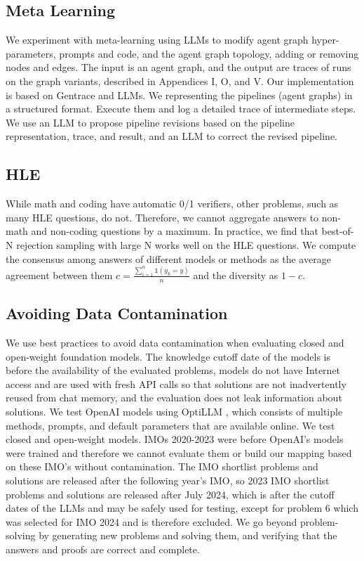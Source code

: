 \subsection{Meta Learning}
We experiment with meta-learning using LLMs to modify agent graph hyper-parameters, prompts and code, and the agent graph topology, adding or removing nodes and edges. The input is an agent graph, and the output are traces of runs on the graph variants, described in Appendices I, O, and V. Our implementation is based on Gentrace \cite{gentrace} and LLMs.
We representing the pipelines (agent graphs) in a structured format. Execute them and log a detailed trace of intermediate steps. We use an LLM to propose pipeline revisions based on the pipeline representation, trace, and result, and an LLM to correct the revised pipeline.

\subsection{HLE}
While math and coding have automatic 0/1 verifiers, other problems, such as many HLE questions, do not. Therefore, we cannot aggregate answers to non-math and non-coding questions by a maximum. In practice, we find that best-of-N rejection sampling with large N works well on the HLE questions. We compute the consensus among answers of different models or methods as the average agreement between them $c = \frac{\sum_{i=1}^{n} \mathds{1}(y_{k} = y)}{n}$ and the diversity as $1 - c$.

\subsection{Avoiding Data Contamination}
We use best practices to avoid data contamination when evaluating closed and open-weight foundation models. The knowledge cutoff date of the models is before the availability of the evaluated problems, models do not have Internet access and are used with fresh API calls so that solutions are not inadvertently reused from chat memory, and the evaluation does not leak information about solutions. We test OpenAI models using OptiLLM \cite{optillm}, which consists of multiple methods, prompts, and default parameters that are available online. We test closed and open-weight models. IMOs 2020-2023 were before OpenAI's models were trained and therefore we cannot evaluate them or build our mapping based on these IMO's without contamination. The IMO shortlist problems and solutions are released after the following year's IMO, so 2023 IMO shortlist problems and solutions are released after July 2024, which is after the cutoff dates of the LLMs and may be safely used for testing, except for problem 6 which was selected for IMO 2024 and is therefore excluded. We go beyond problem-solving by generating new problems and solving them, and verifying that the answers and proofs are correct and complete. 


